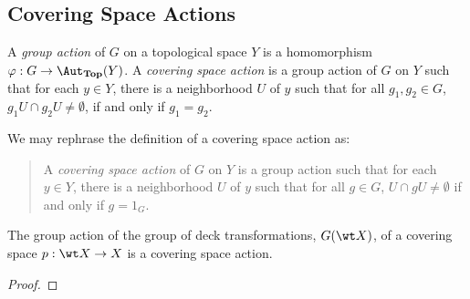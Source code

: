 \subsection{Covering Space Actions}

\begin{definition}
    A \textit{group action} of $G$ on a topological space $Y$ is a homomorphism $\varphi: G\to\Aut_{\catTop}(Y)$. A \textit{covering space action} is a group action of $G$ on $Y$ such that for each $y\in Y$, there is a neighborhood $U$ of $y$ such that for all $g_1,g_2\in G$, $g_1U\cap g_2U\ne\emptyset$, if and only if  $g_1 = g_2$.
\end{definition}

We may rephrase the definition of a covering space action as: 
\begin{quote}
    A \textit{covering space action} of $G$ on $Y$ is a group action such that for each $y\in Y$, there is a neighborhood $U$ of $y$ such that for all $g\in G$, $U\cap gU\ne\emptyset$ if and only if $g = 1_G$.
\end{quote}

\begin{proposition}
    The group action of the group of deck transformations, $G(\wt X)$, of a covering space $p:\wt X\to X$ is a covering space action.
\end{proposition}
\begin{proof}
    
\end{proof}

